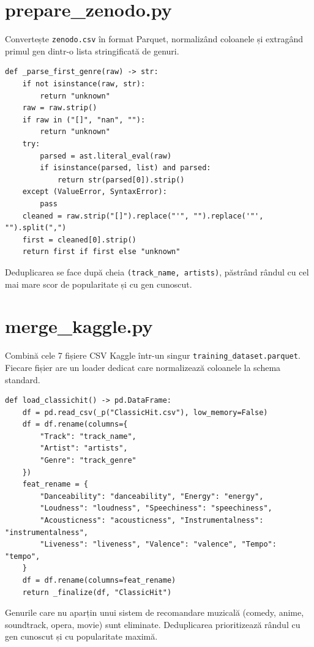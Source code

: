 \documentclass[12pt,a4paper]{report}
\begin{document}
\section{prepare\_zenodo.py}

Convertește \texttt{zenodo.csv} în format Parquet, normalizând coloanele și
extragând primul gen dintr-o lista stringificată de genuri.

\begin{lstlisting}[style=python, caption={Extragerea primului gen din lista Zenodo}]
def _parse_first_genre(raw) -> str:
    if not isinstance(raw, str):
        return "unknown"
    raw = raw.strip()
    if raw in ("[]", "nan", ""):
        return "unknown"
    try:
        parsed = ast.literal_eval(raw)
        if isinstance(parsed, list) and parsed:
            return str(parsed[0]).strip()
    except (ValueError, SyntaxError):
        pass
    cleaned = raw.strip("[]").replace("'", "").replace('"', "").split(",")
    first = cleaned[0].strip()
    return first if first else "unknown"
\end{lstlisting}

Deduplicarea se face după cheia \texttt{(track\_name, artists)}, păstrând
rândul cu cel mai mare scor de popularitate și cu gen cunoscut.

\section{merge\_kaggle.py}

Combină cele 7 fișiere CSV Kaggle într-un singur \texttt{training\_dataset.parquet}.
Fiecare fișier are un loader dedicat care normalizează coloanele la schema standard.

\begin{lstlisting}[style=python, caption={Loader pentru ClassicHit.csv (coloane cu majuscule)}]
def load_classichit() -> pd.DataFrame:
    df = pd.read_csv(_p("ClassicHit.csv"), low_memory=False)
    df = df.rename(columns={
        "Track": "track_name",
        "Artist": "artists",
        "Genre": "track_genre"
    })
    feat_rename = {
        "Danceability": "danceability", "Energy": "energy",
        "Loudness": "loudness", "Speechiness": "speechiness",
        "Acousticness": "acousticness", "Instrumentalness": "instrumentalness",
        "Liveness": "liveness", "Valence": "valence", "Tempo": "tempo",
    }
    df = df.rename(columns=feat_rename)
    return _finalize(df, "ClassicHit")
\end{lstlisting}

Genurile care nu aparțin unui sistem de recomandare muzicală (comedy, anime,
soundtrack, opera, movie) sunt eliminate. Deduplicarea prioritizează rândul cu
gen cunoscut și cu popularitate maximă.
\end{document}
